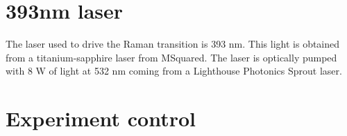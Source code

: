 \section{393nm laser}
The laser used to drive the Raman transition is 393 nm. This light is obtained from a titanium-sapphire laser from MSquared. The laser is optically pumped with 8 W of light at 532 nm coming from a Lighthouse Photonics Sprout laser.




\section{Experiment control}
